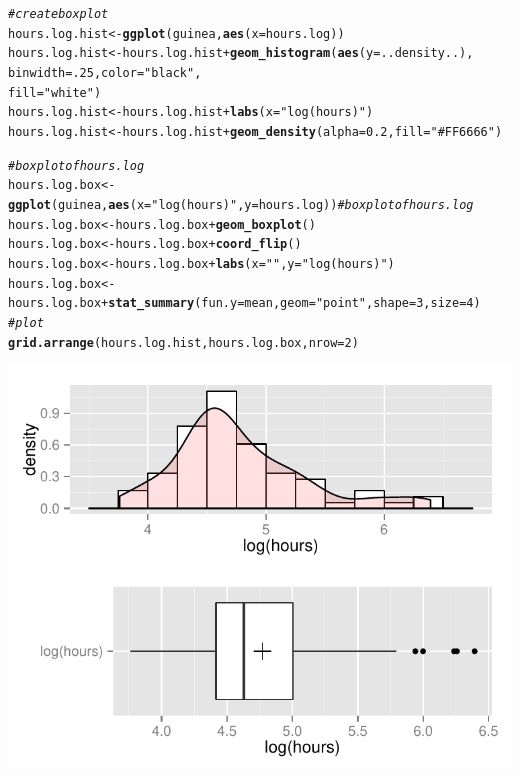 \documentclass{article}\usepackage[]{graphicx}\usepackage[]{color}
\makeatletter
\def\maxwidth{ %
  \ifdim\Gin@nat@width>\linewidth
    \linewidth
  \else
    \Gin@nat@width
  \fi
}
\newcommand{\hlnum}[1]{\textcolor[rgb]{0.686,0.059,0.569}{#1}}%
\newcommand{\hlstr}[1]{\textcolor[rgb]{0.192,0.494,0.8}{#1}}%
\newcommand{\hlcom}[1]{\textcolor[rgb]{0.678,0.584,0.686}{\textit{#1}}}%
\newcommand{\hlopt}[1]{\textcolor[rgb]{0,0,0}{#1}}%
\newcommand{\hlstd}[1]{\textcolor[rgb]{0.345,0.345,0.345}{#1}}%
\newcommand{\hlkwb}[1]{\textcolor[rgb]{0.69,0.353,0.396}{#1}}%
\newcommand{\hlkwc}[1]{\textcolor[rgb]{0.333,0.667,0.333}{#1}}%
\newcommand{\hlkwd}[1]{\textcolor[rgb]{0.737,0.353,0.396}{\textbf{#1}}}%
\newenvironment{kframe}{%
 \def\at@end@of@kframe{}%
 \ifinner\ifhmode%
  \def\at@end@of@kframe{\end{minipage}}%
  \begin{minipage}{\columnwidth}%
 \fi\fi%
 \def\FrameCommand##1{\hskip\@totalleftmargin \hskip-\fboxsep
 \colorbox{shadecolor}{##1}\hskip-\fboxsep
     \hskip-\linewidth \hskip-\@totalleftmargin \hskip\columnwidth}%
 \MakeFramed {\advance\hsize-\width
   \@totalleftmargin\z@ \linewidth\hsize
   \@setminipage}}%
 {\par\unskip\endMakeFramed%
 \at@end@of@kframe}
\newenvironment{knitrout}{}{} %
\makeatother
\begin{document}
\begin{knitrout}
\color{fgcolor}\begin{kframe}
\begin{alltt}
\hlcom{#create box plot}
\hlstd{hours.log.hist} \hlkwb{<-} \hlkwd{ggplot}\hlstd{(guinea,} \hlkwd{aes}\hlstd{(}\hlkwc{x} \hlstd{= hours.log))}
\hlstd{hours.log.hist} \hlkwb{<-} \hlstd{hours.log.hist} \hlopt{+} \hlkwd{geom_histogram}\hlstd{(}\hlkwd{aes}\hlstd{(}\hlkwc{y} \hlstd{= ..density..),}
                                                  \hlkwc{binwidth} \hlstd{=} \hlnum{.25}\hlstd{,} \hlkwc{color} \hlstd{=} \hlstr{"black"}\hlstd{,}
                                                  \hlkwc{fill} \hlstd{=} \hlstr{"white"}\hlstd{)}
\hlstd{hours.log.hist} \hlkwb{<-} \hlstd{hours.log.hist} \hlopt{+} \hlkwd{labs}\hlstd{(}\hlkwc{x} \hlstd{=} \hlstr{"log(hours)"}\hlstd{)}
\hlstd{hours.log.hist} \hlkwb{<-} \hlstd{hours.log.hist} \hlopt{+} \hlkwd{geom_density}\hlstd{(}\hlkwc{alpha} \hlstd{=} \hlnum{0.2}\hlstd{,} \hlkwc{fill} \hlstd{=} \hlstr{"#FF6666"}\hlstd{)}

\hlcom{# boxplot of hours.log}
\hlstd{hours.log.box} \hlkwb{<-} \hlkwd{ggplot}\hlstd{(guinea,} \hlkwd{aes}\hlstd{(}\hlkwc{x} \hlstd{=} \hlstr{"log(hours)"}\hlstd{,} \hlkwc{y} \hlstd{= hours.log))} \hlcom{# boxplot of hours.log}
\hlstd{hours.log.box} \hlkwb{<-} \hlstd{hours.log.box} \hlopt{+} \hlkwd{geom_boxplot}\hlstd{()}
\hlstd{hours.log.box} \hlkwb{<-} \hlstd{hours.log.box} \hlopt{+} \hlkwd{coord_flip}\hlstd{()}
\hlstd{hours.log.box} \hlkwb{<-} \hlstd{hours.log.box} \hlopt{+} \hlkwd{labs}\hlstd{(}\hlkwc{x} \hlstd{=} \hlstr{""}\hlstd{,} \hlkwc{y} \hlstd{=} \hlstr{"log(hours)"}\hlstd{)}
\hlstd{hours.log.box} \hlkwb{<-} \hlstd{hours.log.box} \hlopt{+} \hlkwd{stat_summary}\hlstd{(}\hlkwc{fun.y} \hlstd{= mean,} \hlkwc{geom} \hlstd{=} \hlstr{"point"}\hlstd{,} \hlkwc{shape} \hlstd{=} \hlnum{3}\hlstd{,} \hlkwc{size} \hlstd{=} \hlnum{4}\hlstd{)}
\hlcom{# plot}
\hlkwd{grid.arrange}\hlstd{(hours.log.hist, hours.log.box,} \hlkwc{nrow} \hlstd{=} \hlnum{2}\hlstd{)}
\end{alltt}
\end{kframe}

{\centering \includegraphics[width=\maxwidth]{figure/2_c-1} 

}
\end{knitrout}
\end{document}
